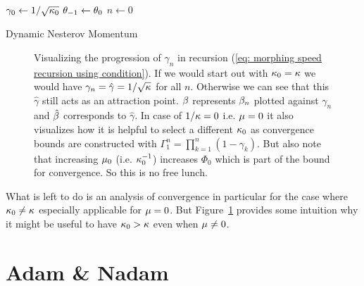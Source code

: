 \begin{algorithm}
	\(\gamma_0 \leftarrow 1/\sqrt{\kappa_0}\)
	\(\theta_{-1} \leftarrow \theta_0\)\;
	\(n\leftarrow 0\)\;
	\caption{Dynamic Nesterov Momentum\label{algo: dynamic nesterov momentum}}
\end{algorithm}

\begin{figure}[h]
	\centering
	\def\svgwidth{1\textwidth}
	
	\caption{
		Visualizing the progression of \(\gamma_n\) in recursion (\ref{eq:
		morphing speed recursion using condition}). If we would start out with
		\(\kappa_0=\kappa\) we would have \(\gamma_n=\hat{\gamma}=1/\sqrt{\kappa}\)
		for all \(n\). Otherwise we can see that this \(\hat{\gamma}\) still
		acts as an attraction point. \(\beta\) represents \(\beta_n\)
		plotted against \(\gamma_n\) and \(\hat{\beta}\) corresponds
		to \(\hat{\gamma}\).
		In case of \(1/\kappa=0\) i.e. \(\mu=0\)
		it also visualizes how it is helpful to select a different \(\kappa_0\)
		as convergence bounds are constructed with
		\(\Gamma_1^n=\prod_{k=1}^n(1-\gamma_k)\).
		But also note that increasing \(\mu_0\) (i.e. \(\kappa_0^{-1}\))
		increases \(\Phi_0\) which is part of the bound for convergence. So
		this is no free lunch.
	}
	\label{fig: gamma path}
\end{figure}

What is left to do is an analysis of convergence in particular for the case
where \(\kappa_0\neq\kappa\) especially applicable for \(\mu=0\).
But Figure~\ref{fig: gamma path} provides some intuition why it might be useful to
have \(\kappa_0>\kappa\) even when \(\mu\neq0\).


\section{Adam \& Nadam}


\endinput

